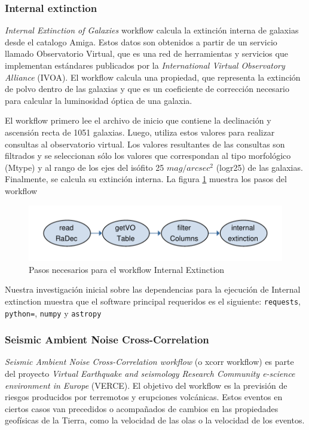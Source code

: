 \subsubsection{Internal extinction}

\textit{Internal Extinction of Galaxies} workflow calcula la extinción interna de galaxias desde el catalogo Amiga. Estos datos son obtenidos a partir de un servicio llamado Observatorio Virtual, que es una red de herramientas y servicios que implementan estándares publicados por la \textit{International Virtual Observatory Alliance} (IVOA). El workflow calcula una propiedad, que representa la extinción de polvo dentro de las galaxias y que es un coeficiente de corrección necesario para calcular la luminosidad óptica de una galaxia.

El workflow primero lee el archivo de inicio que contiene la declinación y ascensión recta de 1051 galaxias. Luego, utiliza estos valores para realizar consultas al observatorio virtual. Los valores resultantes de las consultas son filtrados y se seleccionan sólo los valores que correspondan al tipo morfológico (Mtype) y al rango de los ejes del isófito 25 $mag/arcsec^{2}$ (logr25) de las galaxias. Finalmente, se calcula su extinción interna. La figura \ref{fig:internal} muestra los pasos del workflow

\begin{figure}[t]
\centering
\includegraphics[width=.8\textwidth]{Figures/internal-extinction}
\caption[Representación workflow: Internal Extinction]{Pasos necesarios para el workflow Internal Extinction}\label{fig:internal}
\end{figure}

Nuestra investigación inicial sobre las dependencias para la ejecución de Internal extinction muestra que el software principal requeridos es el siguiente:  \verb|requests|, \verb|python=|, \verb|numpy| y \verb|astropy|

\subsubsection{Seismic Ambient Noise Cross-Correlation}
\textit{Seismic Ambient Noise Cross-Correlation workflow} (o xcorr workflow) es parte del proyecto \textit{Virtual Earthquake and seismology Research Community e-science environment in Europe} (VERCE). 
El objetivo del workflow es la previsión de riesgos producidos por terremotos y erupciones volcánicas. Estos eventos en ciertos casos van precedidos o acompañados de cambios en las propiedades geofísicas de la Tierra, como la velocidad de las olas o la velocidad de los eventos. 

